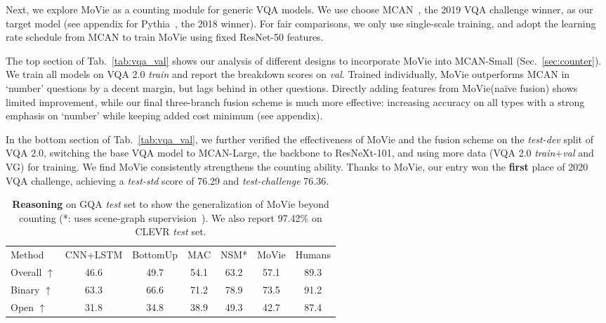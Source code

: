 \documentclass{article} \usepackage[dvipsnames,table]{xcolor}
\newcommand{\ours}[0]{MoVie\xspace}
\newcommand{\tablestyle}[2]{\setlength{\tabcolsep}{#1}\renewcommand{\arraystretch}{#2}\centering\footnotesize}
\begin{document}
Next, we explore \ours as a counting module for generic VQA models. We use choose MCAN~\cite{yu2019deep}, the 2019 VQA challenge winner, as our target model (see appendix for Pythia~\cite{jiang2018pythia}, the 2018 winner). For fair comparisons, we only use single-scale training, and adopt the learning rate schedule from MCAN to train \ours using fixed ResNet-50 features.

The top section of Tab.~\ref{tab:vqa_val} shows our analysis of different designs to incorporate \ours into MCAN-Small (Sec.~\ref{sec:counter}). We train all models on VQA 2.0 {\em train} and report the breakdown scores on {\em val}. Trained individually, \ours outperforms MCAN in `number' questions by a decent margin, but lags behind in other questions. Directly adding features from \ours (na\"{i}ve fusion) shows limited improvement, while our final three-branch fusion scheme is much more effective: increasing accuracy on all types with a strong emphasis on `number' while keeping added cost minimum (see appendix).

In the bottom section of Tab.~\ref{tab:vqa_val}, we further verified the effectiveness of \ours and the fusion scheme on the {\em test-dev} split of VQA 2.0, switching the base VQA model to MCAN-Large, the backbone to ResNeXt-101, and using more data (VQA 2.0 {\em train}+{\em val} and VG) for training. We find \ours consistently strengthens the counting ability. Thanks to \ours, our entry won the \textbf{first} place of 2020 VQA challenge, achieving a \emph{test-std} score of 76.29 and \emph{test-challenge} 76.36. 

\begin{table}[t]
\tablestyle{3.5pt}{1.1}
\begin{tabular}{l|cccc|c|c}
Method & CNN+LSTM & BottomUp \citeyearpar{anderson2018bottom} & MAC \citeyearpar{hudson2018compositional} & NSM* \citeyearpar{hudson2019learning} & \ours & Humans \\
\shline
Overall $\uparrow$ & 46.6 & 49.7 & 54.1 & 63.2 & 57.1 & 89.3 \\
Binary $\uparrow$ & 63.3 & 66.6 & 71.2 & 78.9 & 73.5 & 91.2 \\
Open $\uparrow$ & 31.8 & 34.8 & 38.9 & 49.3 & 42.7 & 87.4 \\
\end{tabular}
\smallskip
\caption{{\bf Reasoning} on GQA {\em test} set to show the generalization of \ours beyond counting (*: uses scene-graph supervision~\cite{krishna2017visual}). We also report 97.42\% on CLEVR \emph{test} set.} 
\label{tab:gqa}
\end{table}
\end{document}
